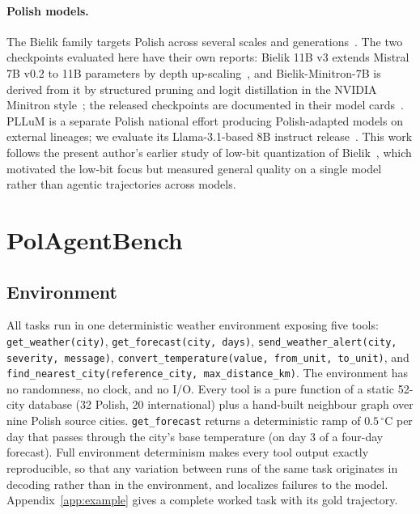 \documentclass[11pt]{article}
\begin{document}
\paragraph{Polish models.} The Bielik family targets Polish across several scales and generations~\cite{bielik7b,bielik11bv2,bielikv3}. The two checkpoints evaluated here have their own reports: Bielik 11B v3 extends Mistral 7B v0.2 to 11B parameters by depth up-scaling~\cite{bielik11bv3}, and Bielik-Minitron-7B is derived from it by structured pruning and logit distillation in the NVIDIA Minitron style~\cite{bielikminitron,minitron}; the released checkpoints are documented in their model cards~\cite{bielik11bv3card,bielikminitroncard}. PLLuM is a separate Polish national effort producing Polish-adapted models on external lineages; we evaluate its Llama-3.1-based 8B instruct release~\cite{pllum}. This work follows the present author's earlier study of low-bit quantization of Bielik~\cite{priorwork}, which motivated the low-bit focus but measured general quality on a single model rather than agentic trajectories across models.

\section{PolAgentBench}
\label{sec:bench}

\subsection{Environment}
\begin{sloppypar}\noindent All tasks run in one deterministic weather environment exposing five tools: \texttt{get\_\allowbreak{}weather(city)}, \texttt{get\_\allowbreak{}forecast(city,\allowbreak{} days)}, \texttt{send\_\allowbreak{}weather\_\allowbreak{}alert(city,\allowbreak{} severity,\allowbreak{} message)}, \texttt{convert\_\allowbreak{}temperature(value,\allowbreak{} from\_\allowbreak{}unit,\allowbreak{} to\_\allowbreak{}unit)}, and \texttt{find\_\allowbreak{}nearest\_\allowbreak{}city(reference\_\allowbreak{}city,\allowbreak{} max\_\allowbreak{}distance\_\allowbreak{}km)}. The environment has no randomness, no clock, and no I/O. Every tool is a pure function of a static 52-city database (32 Polish, 20 international) plus a hand-built neighbour graph over nine Polish source cities. \texttt{get\_forecast} returns a deterministic ramp of $0.5\,^{\circ}$C per day that passes through the city's base temperature (on day 3 of a four-day forecast). Full environment determinism makes every tool output exactly reproducible, so that any variation between runs of the same task originates in decoding rather than in the environment, and localizes failures to the model. Appendix~\ref{app:example} gives a complete worked task with its gold trajectory.\end{sloppypar}
\end{document}
